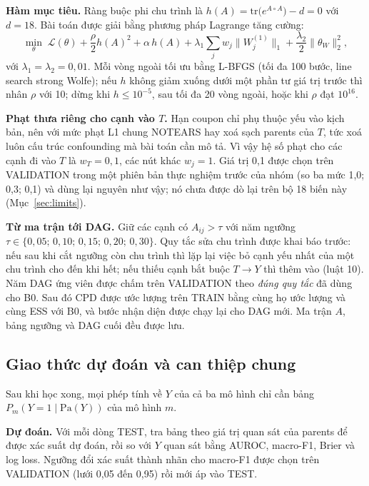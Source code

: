 \documentclass[pdflatex,sn-mathphys-num]{sn-jnl}%
\newcommand{\PaY}{\mathrm{Pa}(Y)}                 %
\begin{document}
\textbf{Hàm mục tiêu.} Ràng buộc phi chu trình là $h(A) = \mathrm{tr}\big(e^{A \circ A}\big) - d = 0$ \cite{zheng2018} với $d=18$. Bài toán được giải bằng phương pháp Lagrange tăng cường:
\begin{equation}\label{eq:notears}
\min_{\theta}\; \mathcal{L}(\theta) + \frac{\rho}{2}h(A)^2 + \alpha\,h(A) + \lambda_1 \sum_{j} w_j \big\lVert W^{(1)}_{j} \big\rVert_1 + \frac{\lambda_2}{2}\lVert \theta_W \rVert_2^2 ,
\end{equation}
với $\lambda_1=\lambda_2=0{,}01$. Mỗi vòng ngoài tối ưu bằng L-BFGS (tối đa 100 bước, line search strong Wolfe); nếu $h$ không giảm xuống dưới một phần tư giá trị trước thì nhân $\rho$ với 10; dừng khi $h \le 10^{-5}$, sau tối đa 20 vòng ngoài, hoặc khi $\rho$ đạt $10^{16}$.

\textbf{Phạt thưa riêng cho cạnh vào $T$.} Hạn coupon chỉ phụ thuộc yếu vào kịch bản, nên với mức phạt L1 chung NOTEARS hay xoá sạch parents của $T$, tức xoá luôn cấu trúc confounding mà bài toán cần mô tả. Vì vậy hệ số phạt cho các cạnh đi vào $T$ là $w_T = 0{,}1$, các nút khác $w_j = 1$. Giá trị 0,1 được chọn trên VALIDATION trong một phiên bản thực nghiệm trước của nhóm (so ba mức 1,0; 0,3; 0,1) và dùng lại nguyên như vậy; nó chưa được dò lại trên bộ 18 biến này (Mục~\ref{sec:limits}).

\textbf{Từ ma trận tới DAG.} Giữ các cạnh có $A_{ij} > \tau$ với năm ngưỡng $\tau \in \{0{,}05;\,0{,}10;\,0{,}15;\,0{,}20;\,0{,}30\}$. Quy tắc sửa chu trình được khai báo trước: nếu sau khi cắt ngưỡng còn chu trình thì lặp lại việc bỏ cạnh yếu nhất của một chu trình cho đến khi hết; nếu thiếu cạnh bắt buộc $T \to Y$ thì thêm vào (luật 10). Năm DAG ứng viên được chấm trên VALIDATION theo \emph{đúng quy tắc} đã dùng cho B0. Sau đó CPD được ước lượng trên TRAIN bằng cùng họ ước lượng và cùng ESS với B0, và bước nhận diện được chạy lại cho DAG mới. Ma trận $A$, bảng ngưỡng và DAG cuối đều được lưu.

\subsection{Giao thức dự đoán và can thiệp chung}\label{sec:protocol}

Sau khi học xong, mọi phép tính về $Y$ của cả ba mô hình chỉ cần bảng $P_m(Y{=}1 \mid \PaY)$ của mô hình $m$.

\textbf{Dự đoán.} Với mỗi dòng TEST, tra bảng theo giá trị quan sát của parents để được xác suất dự đoán, rồi so với $Y$ quan sát bằng AUROC, macro-F1, Brier và log loss. Ngưỡng đổi xác suất thành nhãn cho macro-F1 được chọn trên VALIDATION (lưới 0,05 đến 0,95) rồi mới áp vào TEST.
\end{document}
